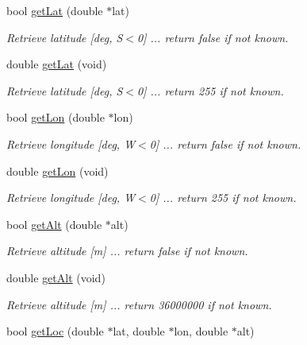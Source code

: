 \begin{DoxyCompactItemize}
bool \hyperlink{classCGPSData_a8df7f0f21a4ff0183d257b7821f8d991}{getLat} (double $\ast$lat)
\begin{DoxyCompactList}\small\item\em Retrieve latitude \mbox{[}deg, S$<$0\mbox{]} ... return false if not known. \item\end{DoxyCompactList}\item 
double \hyperlink{classCGPSData_a1ed8bb5259fc8e55472c769e8791e9ea}{getLat} (void)
\begin{DoxyCompactList}\small\item\em Retrieve latitude \mbox{[}deg, S$<$0\mbox{]} ... return 255 if not known. \item\end{DoxyCompactList}\item 
bool \hyperlink{classCGPSData_a24496ef773a2014dd75ae17ae217ed7e}{getLon} (double $\ast$lon)
\begin{DoxyCompactList}\small\item\em Retrieve longitude \mbox{[}deg, W$<$0\mbox{]} ... return false if not known. \item\end{DoxyCompactList}\item 
double \hyperlink{classCGPSData_a275f85957cb3f28e8fad30675cd2d76a}{getLon} (void)
\begin{DoxyCompactList}\small\item\em Retrieve longitude \mbox{[}deg, W$<$0\mbox{]} ... return 255 if not known. \item\end{DoxyCompactList}\item 
bool \hyperlink{classCGPSData_afb0286ddeb07d9b29ed63539bce31d11}{getAlt} (double $\ast$alt)
\begin{DoxyCompactList}\small\item\em Retrieve altitude \mbox{[}m\mbox{]} ... return false if not known. \item\end{DoxyCompactList}\item 
double \hyperlink{classCGPSData_a25d0505b8eb0d34e31b7909f7cf4bfe9}{getAlt} (void)
\begin{DoxyCompactList}\small\item\em Retrieve altitude \mbox{[}m\mbox{]} ... return 36000000 if not known. \item\end{DoxyCompactList}\item 
bool \hyperlink{classCGPSData_a680b3dff34b1839250eb4ea707917b02}{getLoc} (double $\ast$lat, double $\ast$lon, double $\ast$alt)

\end{DoxyCompactItemize}
